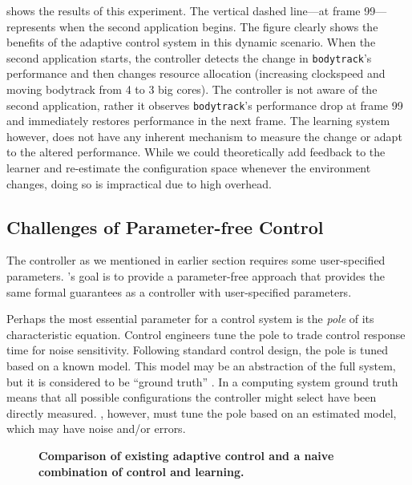  shows the results of this experiment.  The
vertical dashed line---at frame 99---represents when the second
application begins.  The figure clearly shows the benefits of the
adaptive control system in this dynamic scenario.  When the second
application starts, the controller detects the change in
\texttt{bodytrack}'s performance and then changes resource allocation
(increasing clockspeed and moving bodytrack from 4 to 3 big cores).
The controller is not aware of the second application, rather it
observes \texttt{bodytrack}'s performance drop at frame 99 and
immediately restores performance in the next frame. The learning
system however, does not have any inherent mechanism to measure the
change or adapt to the altered performance.  While we could
theoretically add feedback to the learner and re-estimate the
configuration space whenever the environment changes, doing so is
impractical due to high overhead\cite{pargon,LEO}.


\subsection{Challenges of Parameter-free Control}
The controller as we mentioned in earlier section requires some user-specified parameters.
\SYSTEM{}'s goal is to provide a parameter-free approach that provides
the same formal guarantees as a controller with user-specified
parameters.

Perhaps the most essential parameter for a control system is the
\emph{pole} of its characteristic equation.  Control engineers tune
the pole to trade control response time for noise sensitivity.
Following standard control design, the pole is tuned based on a known
model.  This model may be an abstraction of the full system, but it is
considered to be ``ground truth'' \cite{Hellerstein2004a}. In a
computing system ground truth means that all possible configurations
the controller might select have been directly measured.  \SYSTEM{},
however, must tune the pole based on an estimated model, which may
have noise and/or errors.


\begin{figure}
\centering

\caption{\small \bf Comparison of existing adaptive control and a
  naive combination of control and learning.}
\label{fig:not-simple}
\end{figure}

